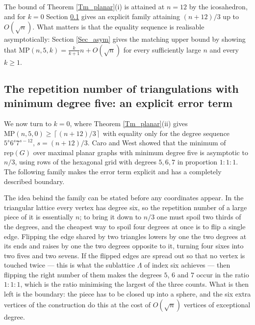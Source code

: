 \documentclass[12pt,a4paper]{article}%
\begin{document}


The bound of Theorem \ref{Tm_planar}(i) is attained at $n=12$ by the icosahedron, and for $k=0$ Section
\ref{Sec_hex} gives an explicit family attaining $(n+12)/3$ up to $O(\sqrt{n})$. What matters is that the
equality sequence is realisable asymptotically: Section \ref{Sec_asym} gives the matching upper bound by
showing that $\mathrm{MP}(n,5,k)=\frac{k}{k+1}n+O(\sqrt{n})$ for every sufficiently large $n$ and every
$k\geq 1$.

\subsection{The repetition number of triangulations with minimum degree five: an explicit error
term}
\label{Sec_hex}

We now turn to $k=0$, where Theorem \ref{Tm_planar}(ii) gives
$\mathrm{MP}(n,5,0)\geq \left\lceil (n+12)/3\right\rceil $ with equality only for the degree sequence
$5^{s}6^{s}7^{s-12}$, $s=(n+12)/3$. Caro and West \cite[Theorem 2.5]{CaroWest} showed that the minimum
of $\mathrm{rep}(G)$ over maximal planar graphs with minimum degree five is asymptotic to $n/3$, using rows
of the hexagonal grid with degrees $5,6,7$ in proportion $1:1:1$. The following family makes the
error term explicit and has a completely described boundary.

The idea behind the family can be stated before any coordinates appear. In the
triangular lattice every vertex has degree six, so the repetition number of a
large piece of it is essentially $n$; to bring it down to $n/3$ one must spoil
two thirds of the degrees, and the cheapest way to spoil four degrees at once is
to flip a single edge. Flipping the edge shared by two triangles lowers by one
the two degrees at its ends and raises by one the two degrees opposite to it,
turning four sixes into two fives and two sevens. If the flipped edges are
spread out so that no vertex is touched twice --- this is what the sublattice
$\Lambda $ of index six achieves --- then flipping the right number of them
makes the degrees $5$, $6$ and $7$ occur in the ratio $1:1:1$, which is the
ratio minimising the largest of the three counts. What is then left is the
boundary: the piece has to be closed up into a sphere, and the six extra
vertices of the construction do this at the cost of $O(\sqrt{n})$ vertices of
exceptional degree.
\end{document}
